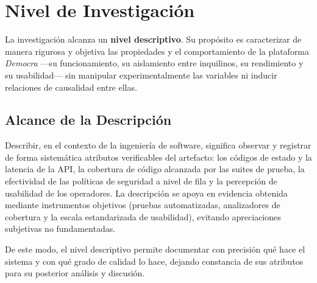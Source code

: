 \section{Nivel de Investigaci\'on}

La investigaci\'on alcanza un \textbf{nivel descriptivo}. Su prop\'osito es
caracterizar de manera rigurosa y objetiva las propiedades y el comportamiento de
la plataforma \textit{Democra} ---su funcionamiento, su aislamiento entre
inquilinos, su rendimiento y su usabilidad--- sin manipular experimentalmente las
variables ni inducir relaciones de causalidad entre ellas.

\subsection{Alcance de la Descripci\'on}

Describir, en el contexto de la ingenier\'ia de software, significa observar y
registrar de forma sistem\'atica atributos verificables del artefacto: los
c\'odigos de estado y la latencia de la API, la cobertura de c\'odigo alcanzada por
las suites de prueba, la efectividad de las pol\'iticas de seguridad a nivel de
fila y la percepci\'on de usabilidad de los operadores. La descripci\'on se apoya
en evidencia obtenida mediante instrumentos objetivos (pruebas automatizadas,
analizadores de cobertura y la escala estandarizada de usabilidad), evitando
apreciaciones subjetivas no fundamentadas.

De este modo, el nivel descriptivo permite documentar con precisi\'on qu\'e hace el
sistema y con qu\'e grado de calidad lo hace, dejando constancia de sus atributos
para su posterior an\'alisis y discusi\'on.
